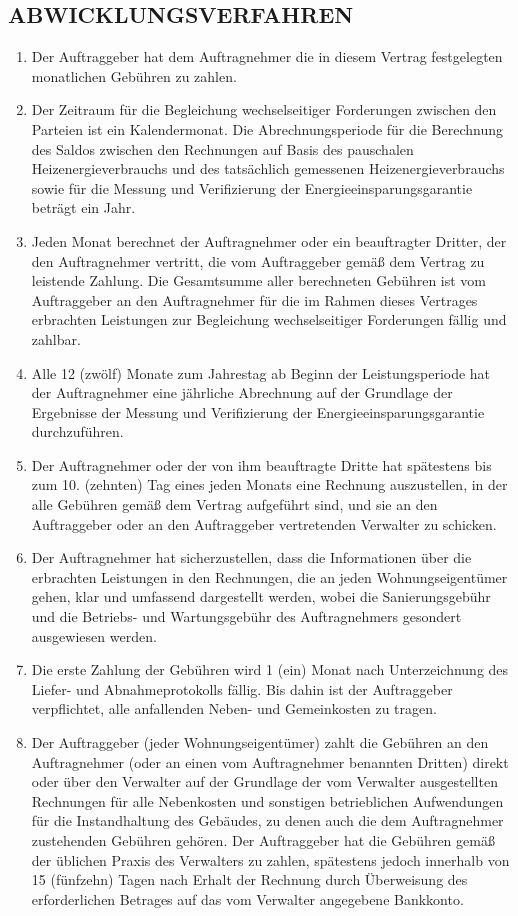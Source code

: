 \begin{multicols}{2}
  \subsection{ABWICKLUNGSVERFAHREN}
  \begin{enumerate}
   \item Der Auftraggeber hat dem Auftragnehmer die in diesem Vertrag festgelegten monatlichen Gebühren zu zahlen.
   \item Der Zeitraum für die Begleichung wechselseitiger Forderungen zwischen den Parteien ist ein Kalendermonat. Die Abrechnungsperiode für die Berechnung des Saldos zwischen den Rechnungen auf Basis des pauschalen Heizenergieverbrauchs und des tatsächlich gemessenen Heizenergieverbrauchs sowie für die Messung und Verifizierung der Energieeinsparungsgarantie beträgt ein Jahr.
   \item Jeden Monat berechnet der Auftragnehmer oder ein beauftragter Dritter, der den Auftragnehmer vertritt, die vom Auftraggeber gemäß dem Vertrag zu leistende Zahlung. Die Gesamtsumme aller berechneten Gebühren ist vom Auftraggeber an den Auftragnehmer für die im Rahmen dieses Vertrages erbrachten Leistungen zur Begleichung wechselseitiger Forderungen fällig und zahlbar.
   \item Alle 12 (zwölf) Monate zum Jahrestag ab Beginn der Leistungsperiode hat der Auftragnehmer eine jährliche Abrechnung auf der Grundlage der Ergebnisse der Messung und Verifizierung der Energieeinsparungsgarantie durchzuführen.
   \item Der Auftragnehmer oder der von ihm beauftragte Dritte hat spätestens bis zum 10. (zehnten) Tag eines jeden Monats eine Rechnung auszustellen, in der alle Gebühren gemäß dem Vertrag aufgeführt sind, und sie an den Auftraggeber oder an den Auftraggeber vertretenden Verwalter zu schicken.
   \item Der Auftragnehmer hat sicherzustellen, dass die Informationen über die erbrachten Leistungen in den Rechnungen, die an jeden Wohnungseigentümer gehen, klar und umfassend dargestellt werden, wobei die Sanierungsgebühr und die Betriebs- und Wartungsgebühr des Auftragnehmers gesondert ausgewiesen werden.
   \item Die erste Zahlung der Gebühren wird 1 (ein) Monat nach Unterzeichnung des Liefer- und Abnahmeprotokolls fällig. Bis dahin ist der Auftraggeber verpflichtet, alle anfallenden Neben- und Gemeinkosten zu tragen.
   \item Der Auftraggeber (jeder Wohnungseigentümer) zahlt die Gebühren an den Auftragnehmer (oder an einen vom Auftragnehmer benannten Dritten) direkt oder über den Verwalter auf der Grundlage der vom Verwalter ausgestellten Rechnungen für alle Nebenkosten und sonstigen betrieblichen Aufwendungen für die Instandhaltung des Gebäudes, zu denen auch die dem Auftragnehmer zustehenden Gebühren gehören. Der Auftraggeber hat die Gebühren gemäß der üblichen Praxis des Verwalters zu zahlen, spätestens jedoch innerhalb von 15 (fünfzehn) Tagen nach Erhalt der Rechnung durch Überweisung des erforderlichen Betrages auf das vom Verwalter angegebene Bankkonto.

\end{enumerate}
\end{multicols}
